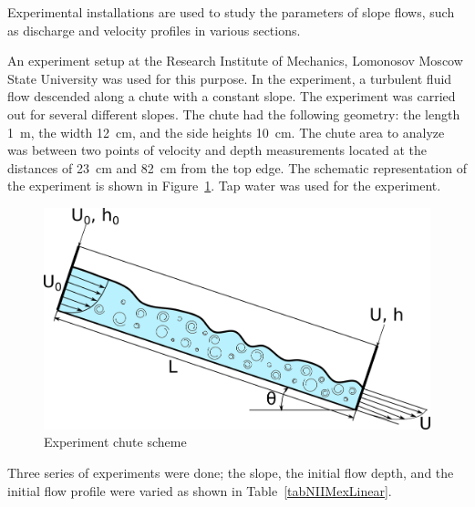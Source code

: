 \documentclass[sensors,article,submit,moreauthors,pdftex]{Definitions/mdpi}
\begin{document}

Experimental installations are used to study the parameters of slope flows, such as discharge and velocity profiles in various sections.

An experiment setup at the Research Institute of Mechanics, Lomonosov Moscow State University was used for this purpose. In the experiment, a turbulent fluid flow descended along a chute with a constant slope. The experiment was carried out for several different slopes. The chute had the following geometry: the length 1~m, the width 12~cm, and the side heights 10~cm. The chute area to analyze was between two points of velocity and depth measurements located at the distances of 23~cm and 82~cm from the top edge. The schematic representation of the experiment is shown in Figure~\ref{NIIMexLinearUProfileInlet}. Tap water was used for the experiment.

\begin{figure}[H]	
\widefigure
\includegraphics[width=10 cm]{NIIMexLinearUProfileInlet.png}
\caption{Experiment chute scheme\label{NIIMexLinearUProfileInlet}}
\end{figure}

Three series of experiments were done; the slope, the initial flow depth, and the initial flow profile were varied as shown in Table~\ref{tabNIIMexLinear}.
\end{document}
